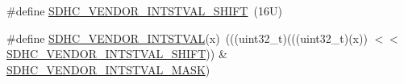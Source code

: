 \begin{DoxyCompactItemize}
\item 
\#define \mbox{\hyperlink{group___s_d_h_c___register___masks_ga3610161a11c6ef0ef2849ef4fca8d12f}{S\+D\+H\+C\+\_\+\+V\+E\+N\+D\+O\+R\+\_\+\+I\+N\+T\+S\+T\+V\+A\+L\+\_\+\+S\+H\+I\+FT}}~(16\+U)
\item 
\#define \mbox{\hyperlink{group___s_d_h_c___register___masks_ga760d0546097587595fec8f13765b6b2e}{S\+D\+H\+C\+\_\+\+V\+E\+N\+D\+O\+R\+\_\+\+I\+N\+T\+S\+T\+V\+AL}}(x)~(((uint32\+\_\+t)(((uint32\+\_\+t)(x)) $<$$<$ \mbox{\hyperlink{group___s_d_h_c___register___masks_ga3610161a11c6ef0ef2849ef4fca8d12f}{S\+D\+H\+C\+\_\+\+V\+E\+N\+D\+O\+R\+\_\+\+I\+N\+T\+S\+T\+V\+A\+L\+\_\+\+S\+H\+I\+FT}})) \& \mbox{\hyperlink{group___s_d_h_c___register___masks_ga59d8694a1bf1d55be388439ed4419ab3}{S\+D\+H\+C\+\_\+\+V\+E\+N\+D\+O\+R\+\_\+\+I\+N\+T\+S\+T\+V\+A\+L\+\_\+\+M\+A\+SK}})
\end{DoxyCompactItemize}
